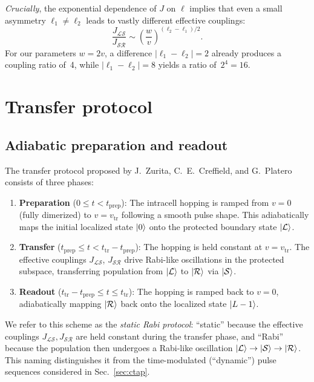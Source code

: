 \documentclass[
  reprint,
  amsmath,
  amssymb,
  aps,
  prb,
  floatfix,
  longbibliography,
]{revtex4-2}
\newcommand{\ttr}{t_{\mathrm{tr}}}
\newcommand{\tprep}{t_{\mathrm{prep}}}
\newcommand{\JLS}{J_{\mathcal{LS}}}
\newcommand{\JSR}{J_{\mathcal{SR}}}
\newcommand{\ketL}{\ket{\mathcal{L}}}
\newcommand{\ketS}{\ket{\mathcal{S}}}
\newcommand{\ketR}{\ket{\mathcal{R}}}
\begin{document}
\emph{Crucially}, the exponential dependence of $J$ on $\ell$ implies that even
a small asymmetry $\ell_1 \neq \ell_2$ leads to vastly different effective
couplings:
\begin{equation}
  \frac{\JLS}{\JSR} \sim
  \left(\frac{w}{v}\right)^{\!(\ell_2 - \ell_1)/2}.
  \label{eq:coupling_ratio}
\end{equation}
For our parameters $w = 2v$, a difference $|\ell_1 - \ell_2| = 2$ already produces
a coupling ratio of~4, while $|\ell_1 - \ell_2| = 8$ yields a ratio of~$2^4 = 16$.

\section{Transfer protocol}
\label{sec:transfer}

\subsection{Adiabatic preparation and readout}
\label{sec:protocol}

The transfer protocol proposed by J.~Zurita, C.~E.~Creffield, and G.~Platero~\cite{Zurita2023}
consists of three phases:
\begin{enumerate}
  \item \textbf{Preparation} ($0 \leq t < \tprep$): The intracell hopping
    is ramped from $v = 0$ (fully dimerized) to $v = v_{\mathrm{tr}}$
    following a smooth pulse shape. This adiabatically maps the initial
    localized state $\ket{0}$ onto the protected boundary state $\ketL$.
  \item \textbf{Transfer} ($\tprep \leq t < \ttr - \tprep$): The hopping
    is held constant at $v = v_{\mathrm{tr}}$. The effective couplings
    $\JLS$, $\JSR$ drive Rabi-like oscillations in the protected subspace,
    transferring population from $\ketL$ to $\ketR$ via $\ketS$.
  \item \textbf{Readout} ($\ttr - \tprep \leq t \leq \ttr$): The hopping
    is ramped back to $v = 0$, adiabatically mapping $\ketR$ back onto the
    localized state $\ket{L-1}$.
\end{enumerate}

We refer to this scheme as the \emph{static Rabi protocol}: ``static'' because
the effective couplings $\JLS,\JSR$ are held constant during the transfer phase,
and ``Rabi'' because the population then undergoes a Rabi-like oscillation
$\ketL \to \ketS \to \ketR$. This naming distinguishes it from the
time-modulated (``dynamic'') pulse sequences considered in
Sec.~\ref{sec:ctap}.
\end{document}
